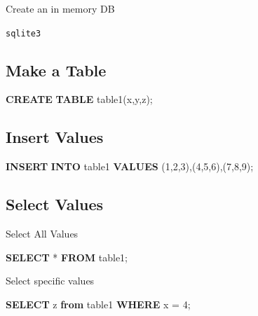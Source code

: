 \documentclass[]{book}
\newenvironment{Shaded}{\begin{snugshade}}{\end{snugshade}}
\newcommand{\KeywordTok}[1]{\textcolor[rgb]{0.13,0.29,0.53}{\textbf{#1}}}
\newcommand{\DecValTok}[1]{\textcolor[rgb]{0.00,0.00,0.81}{#1}}
\newcommand{\NormalTok}[1]{#1}
\theoremstyle{definition}
\theoremstyle{definition}
\theoremstyle{definition}
\theoremstyle{remark}
\begin{document}
Create an in memory DB

\texttt{sqlite3}

\subsection{Make a Table}\label{make-a-table}

\begin{Shaded}
\begin{Highlighting}[]
\KeywordTok{CREATE} \KeywordTok{TABLE}\NormalTok{ table1(x,y,z);}
\end{Highlighting}
\end{Shaded}

\subsection{Insert Values}\label{insert-values}

\begin{Shaded}
\begin{Highlighting}[]
\KeywordTok{INSERT} \KeywordTok{INTO}\NormalTok{ table1 }\KeywordTok{VALUES}\NormalTok{ (}\DecValTok{1}\NormalTok{,}\DecValTok{2}\NormalTok{,}\DecValTok{3}\NormalTok{),(}\DecValTok{4}\NormalTok{,}\DecValTok{5}\NormalTok{,}\DecValTok{6}\NormalTok{),(}\DecValTok{7}\NormalTok{,}\DecValTok{8}\NormalTok{,}\DecValTok{9}\NormalTok{);}
\end{Highlighting}
\end{Shaded}

\subsection{Select Values}\label{select-values}

Select All Values

\begin{Shaded}
\begin{Highlighting}[]
\KeywordTok{SELECT}\NormalTok{ * }\KeywordTok{FROM}\NormalTok{ table1;}
\end{Highlighting}
\end{Shaded}

Select specific values

\begin{Shaded}
\begin{Highlighting}[]
\KeywordTok{SELECT}\NormalTok{ z }\KeywordTok{from}\NormalTok{ table1 }\KeywordTok{WHERE}\NormalTok{ x = }\DecValTok{4}\NormalTok{;}
\end{Highlighting}
\end{Shaded}
\end{document}
